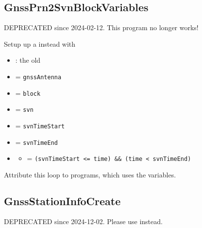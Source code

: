 \clearpage
\subsection{GnssPrn2SvnBlockVariables}\label{GnssPrn2SvnBlockVariables}
DEPRECATED since 2024-02-12. This program no longer works!

Setup up a  instead with
\begin{itemize}
  \item {}: the old 
  \item {}         = \verb|gnssAntenna|
  \item {}      = \verb|block|
  \item {}    = \verb|svn|
  \item {} = \verb|svnTimeStart|
  \item {}   = \verb|svnTimeEnd|
  \item {}
  \begin{itemize}
    \item {} = \verb|(svnTimeStart <= time) && (time < svnTimeEnd)|
  \end{itemize}
\end{itemize}
Attribute this loop to programs, which uses the variables.

\clearpage
\subsection{GnssStationInfoCreate}\label{GnssStationInfoCreate}
DEPRECATED since 2024-12-02. Please use  instead.


